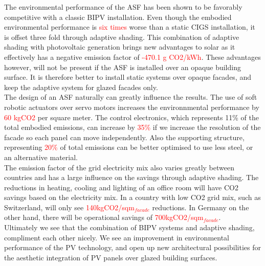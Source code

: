 
The environmental performance of the ASF has been shown to be favorably competitive with a classic BIPV installation. Even though the embodied environmental performance is \textcolor{red}{six times} worse than a static CIGS installation, it is offset three fold through adaptive shading. This combination of adaptive shading with photovoltaic generation brings new advantages to solar as it effectively has a negative emission factor of \textcolor{red}{-470.1 g CO2/kWh}. These advantages however, will not be present if the ASF is installed over an opaque building surface. It is therefore better to install static systems over opaque facades, and keep the adaptive system for glazed facades only. \\
The design of an ASF naturally can greatly influence the results. The use of soft robotic actuators over servo motors increases the environnmental performance by \textcolor{red}{60 kgCO2} per square meter. The control electronics, which represents 11\% of the total embodied emissions, can increase by \textcolor{red}{35\%} if we increase the resolution of the facade so each panel can move independently. Also the supporting structure, representing \textcolor{red}{20\%} of total emissions can be better optimised to use less steel, or an alternative material. \\
The emission factor of the grid electricity mix also varies greatly between countries and has a large influence on the savings through adaptive shading. The reductions in heating, cooling and lighting of an office room will have CO2 savings based on the electricity mix. In a country with low CO2 grid mix, such as Switzerland, will only see \textcolor{red}{140kgCO2/sqm$_{facade}$} reductions. In Germany on the other hand, there will be operational savings of \textcolor{red}{700kgCO2/sqm$_{facade}$}.\\
Ultimately we see that the combination of BIPV systems and adaptive shading, compliment each other nicely. We see an improvement in environmental performance of the PV technology, and open up new architectural possibilities for the aesthetic integration of PV panels over glazed building surfaces.


